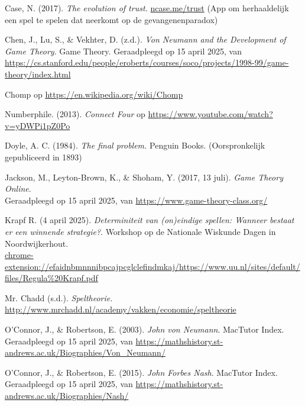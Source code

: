 \begin{bronnen}
    \item Case, N. (2017). \emph{The evolution of trust.} \url{ncase.me/trust} (App om herhaaldelijk een spel te spelen dat neerkomt op de gevangenenparadox)

    \item Chen, J., Lu, S., \& Vekhter, D. (z.d.). \emph{Von Neumann and the Development of Game Theory}. Game Theory. Geraadpleegd op 15 april 2025, van \url{https://cs.stanford.edu/people/eroberts/courses/soco/projects/1998-99/game-theory/index.html}
    
    \item{Chomp op \url{https://en.wikipedia.org/wiki/Chomp}}

    \item{Numberphile. (2013). \emph{Connect Four} op \url{https://www.youtube.com/watch?v=yDWPi1pZ0Po}}
    
    \item{Doyle, A. C. (1984). \emph{The final problem.} Penguin Books. (Oorspronkelijk gepubliceerd in 1893)}

    \item Jackson, M., Leyton-Brown, K., \& Shoham, Y. (2017, 13 juli). \emph{Game Theory Online}.\\ Geraadpleegd op 15 april 2025, van \url{https://www.game-theory-class.org/}
    
    \item{Krapf R. (4 april 2025). \emph{Determiniteit van (on)eindige spellen: Wanneer bestaat er een winnende strategie?}. Workshop op de Nationale Wiskunde Dagen in Noordwijkerhout.} \\ \url{chrome-extension://efaidnbmnnnibpcajpcglclefindmkaj/https://www.uu.nl/sites/default/files/Regula%20Krapf.pdf}
    
    \item Mr. Chadd (s.d.). \emph{Speltheorie.} \url{http://www.mrchadd.nl/academy/vakken/economie/speltheorie}

    \item O'Connor, J., \& Robertson, E. (2003). \emph{John von Neumann}. MacTutor Index.\\ Geraadpleegd op 15 april 2025, van \url{https://mathshistory.st-andrews.ac.uk/Biographies/Von_Neumann/}

    \item O'Connor, J., \& Robertson, E. (2015). \emph{John Forbes Nash}. MacTutor Index.\\ Geraadpleegd op 15 april 2025, van \url{https://mathshistory.st-andrews.ac.uk/Biographies/Nash/}
    

\end{bronnen}
